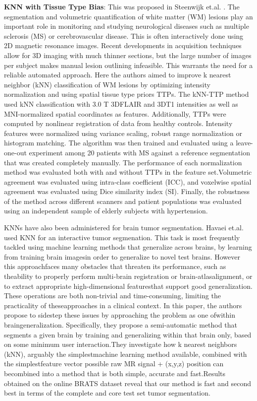 \documentclass[19pt]{article}
\begin{document}
\textbf{KNN with Tissue Type Bias}: This was proposed in Steenwijk et.al. \cite{steenwijk2013accurate}. The segmentation and volumetric quantification of white matter (WM) lesions play an important role in monitoring and studying neurological diseases such as multiple sclerosis (MS) or cerebrovascular disease. This is often interactively done using 2D magnetic resonance images. Recent developments in acquisition techniques allow for 3D imaging with much thinner sections, but the large number of images per subject makes manual lesion outlining infeasible. This warrants the need for a reliable automated approach. Here the authors aimed to improve k nearest neighbor (kNN) classification of WM lesions by optimizing intensity normalization and using spatial tissue type priors TTPs.
The kNN-TTP method used kNN classification with 3.0 T 3DFLAIR and 3DT1 intensities as well as MNI-normalized spatial coordinates as features. Additionally, TTPs were computed by nonlinear registration of data from healthy controls. Intensity features were normalized using variance scaling, robust range normalization or histogram matching. The algorithm was then trained and evaluated using a leave-one-out experiment among 20 patients with MS against a reference segmentation that was created completely manually. The performance of each normalization method was evaluated both with and without TTPs in the feature set.Volumetric agreement was evaluated using intra-class coefficient (ICC), and voxelwise spatial agreement was evaluated using Dice similarity index (SI). Finally, the robustness of the method across different scanners and patient populations was evaluated using an independent sample of elderly subjects with hypertension. 

KNNs have also been administered for brain tumor segmentation. Havaei et.al. \cite{havaei2014efficient} used KNN for an interactive tumor segmenation. This  task  is most  frequently  tackled  using  machine  learning methods that generalize across brains, by learning from training brain imagesin order to generalize to novel test brains. However this approachfaces many obstacles that threaten its performance, such as theability to properly perform multi-brain registration or brain-atlasalignment,  or  to  extract  appropriate  high-dimensional  featuresthat support good generalization. These operations are both non-trivial  and  time-consuming,  limiting  the  practicality  of  theseapproaches in a clinical context. In this paper, the authors propose to sidestep these issues by approaching the problem as one ofwithin braingeneralization. Specifically, they propose a semi-automatic method that segments a given brain by training and generalizing within that  brain  only,  based on some minimum user interaction.They investigate how k nearest neighbors (kNN), arguably the simplestmachine learning method available, combined with the simplestfeature vector possible raw MR signal + (x,y,z) position can becombined into a method that is both simple, accurate and fast.Results  obtained  on  the  online  BRATS  dataset  reveal  that  our method is fast and second best in terms of the complete and core test set tumor segmentation. 
\newpage
\end{document}
